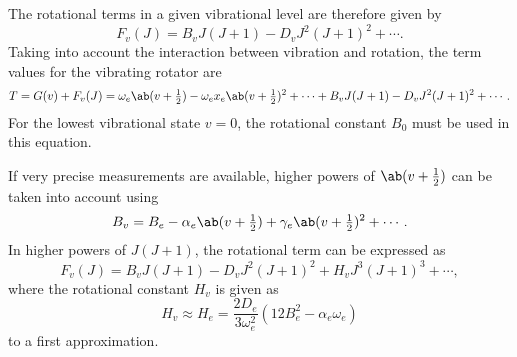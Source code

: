 The rotational terms in a given vibrational level are therefore given by
\begin{equation*}
    F_v(J) = B_vJ(J + 1) - D_vJ^2(J + 1)^2 + \dotsb.
\end{equation*}
Taking into account the interaction between vibration and rotation, the term values for the vibrating rotator are
\begin{equation*}
    T = G(v) + F_v(J) = \omega_e\ab(v + \tfrac{1}{2}) - \omega_ex_e\ab(v + \tfrac{1}{2})^2 + \dotsb + B_vJ(J + 1) - D_vJ^2(J + 1)^2 + \dotsb.
\end{equation*}
For the lowest vibrational state $v = 0$, the rotational constant $B_0$ must be used in this equation.

If very precise measurements are available, higher powers of $\ab(v + \tfrac{1}{2})$ can be taken into account using
\begin{equation*}
    B_v = B_e - \alpha_e\ab(v + \tfrac{1}{2}) + \gamma_e\ab(v + \tfrac{1}{2})^2 + \dotsb.
\end{equation*}
In higher powers of $J(J + 1)$, the rotational term can be expressed as
\begin{equation*}
    F_v(J) = B_vJ(J + 1) - D_vJ^2(J + 1)^2 + H_vJ^3(J + 1)^3 + \dotsb,
\end{equation*}
where the rotational constant $H_v$ is given as
\begin{equation*}
    H_v \approx H_e = \frac{2D_e}{3\omega_e^2}(12B_e^2 - \alpha_e\omega_e)
\end{equation*}
to a first approximation.
